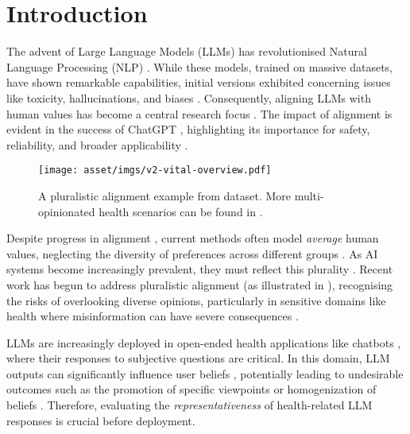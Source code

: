\section{Introduction}



The advent of Large Language Models (LLMs) has revolutionised Natural Language Processing (NLP) \citep{zhao2023survey}. While these models, trained on massive datasets, have shown remarkable capabilities, initial versions exhibited concerning issues like toxicity, hallucinations, and biases \citep{liang2023holistic,perez-etal-2022-red,ganguli2022red,weidinger2021ethical,liu2023trustworthy}. Consequently, aligning LLMs with human values has become a central research focus \citep{ouyang2022training,bai2022training,christiano2017deep,gabriel2020artificial}. The impact of alignment is evident in the success of ChatGPT \citep{gpt4}, highlighting its importance for safety, reliability, and broader applicability \citep{shen2023large,liu2023trustworthy}.

\begin{figure}[!t]
    \centering
    \texttt{[image: asset/imgs/v2-vital-overview.pdf]}
    \vspace{-0.50cm}
    \caption{A pluralistic alignment example from \ourdataset dataset. More multi-opinionated health scenarios can be found in .}
    \label{fig:vital-alignment-overview}
    \vspace{-0.4cm}
\end{figure}

Despite progress in alignment \citep{wang2023aligning,ouyang2022training,stiennon2020learning,christiano2017deep,rafailov2024direct,schulman2017proximal}, current methods often model \textit{average} human values, neglecting the diversity of preferences across different groups \citep{positionpluralistic,sorensen2024value,feng2024modular}. As AI systems become increasingly prevalent, they must reflect this plurality \citep{positionpluralistic}. Recent work has begun to address pluralistic alignment \citep{bai2022constitutional,gordon2022jury,sorensen2024value} (as illustrated in ), recognising the risks of overlooking diverse opinions, particularly in sensitive domains like health where misinformation can have severe consequences \citep{chen2024combating,menz2024current,suarez2021prevalence}.

LLMs are increasingly deployed in open-ended health applications like chatbots \citep{yang2023large,thirunavukarasu2023large}, where their responses to subjective questions are critical. In this domain, LLM outputs can significantly influence user beliefs \citep{santurkar2023whose}, potentially leading to undesirable outcomes such as the promotion of specific viewpoints or homogenization of beliefs \citep{weidinger2021ethical,weidinger2022taxonomy,gabriel2020artificial}. Therefore, evaluating the \textit{representativeness} of health-related LLM responses is crucial before deployment.











